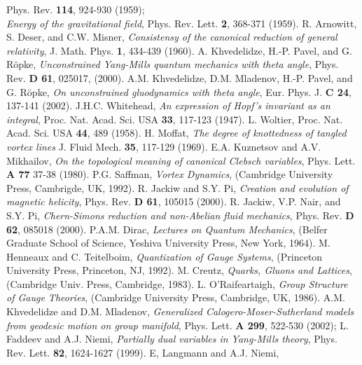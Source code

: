 \documentclass[a4paper,12pt]{article}
\begin{document}
\begin{thebibliography}{99}
Phys. Rev. {\bf 114}, 924-930 (1959);\\
%
{\it Energy of the gravitational field},
Phys. Rev. Lett. {\bf 2}, 368-371 (1959).
%
R. Arnowitt, S. Deser, and C.W. Misner,
{\it Consistensy of the canonical reduction of general relativity},
J. Math. Phys. {\bf 1}, 434-439 (1960).
%
A. Khvedelidze, H.-P. Pavel, and  G. R\"opke,
{\it Unconstrained \coordHE{} Yang-Mills quantum mechanics with theta angle},
Phys. Rev. {\bf D 61}, 025017, (2000).
%
A.M. Khvedelidze, D.M. Mladenov, H.-P. Pavel, and G. R\"opke,
{ \it On unconstrained \coordHE{} gluodynamics with theta angle},
Eur. Phys. J. {\bf C 24}, 137-141 (2002).
%
J.H.C. Whitehead,
{\it An expression of Hopf's invariant as an integral},
Proc. Nat. Acad. Sci. USA {\bf 33}, 117-123 (1947).
%
L. Woltier,
Proc. Nat. Acad. Sci. USA {\bf 44}, 489 (1958).
%
H. Moffat, {\it The degree of knottedness of tangled vortex lines}
J. Fluid Mech. {\bf 35}, 117-129 (1969).
%
E.A. Kuznetsov and A.V. Mikhailov,
{\it On the topological meaning of canonical Clebsch variables},
Phys. Lett. {\bf A 77} 37-38 (1980).
%
P.G. Saffman,
{\it Vortex Dynamics},
(Cambridge University Press, Cambrigde, UK, 1992).
%
R. Jackiw and S.Y. Pi,
{\it Creation and evolution of magnetic helicity},
Phys. Rev. {\bf D 61}, 105015 (2000).
%
R. Jackiw, V.P. Nair, and S.Y. Pi,
{\it Chern-Simons reduction and non-Abelian fluid mechanics},
Phys. Rev. {\bf D 62}, 085018 (2000).
%
P.A.M. Dirac,
{\it Lectures on Quantum Mechanics},
(Belfer Graduate School of Science, Yeshiva University Press, New York, 1964).
%
M. Henneaux and C. Teitelboim,
{\it Quantization of Gauge Systems},
(Princeton University Press, Princeton, NJ, 1992).
%
M. Creutz,
{\it Quarks, Gluons and Lattices},
(Cambridge Univ. Press, Cambridge, 1983).
%
L. O'Raifeartaigh,
{\it Group Structure of Gauge Theories},
(Cambridge University Press, Cambridge, UK, 1986).
%
A.M. Khvedelidze and D.M. Mladenov,
{\it
Generalized Calogero-Moser-Sutherland models from geodesic motion on
\coordHE{} group manifold},
Phys. Lett. {\bf A 299}, 522-530 (2002);
L. Faddeev and A.J. Niemi,
{\it Partially dual variables in \coordHE{} Yang-Mills theory},
Phys. Rev. Lett. {\bf 82}, 1624-1627 (1999).
%
E, Langmann and A.J. Niemi,

\end{thebibliography}
\end{document}
